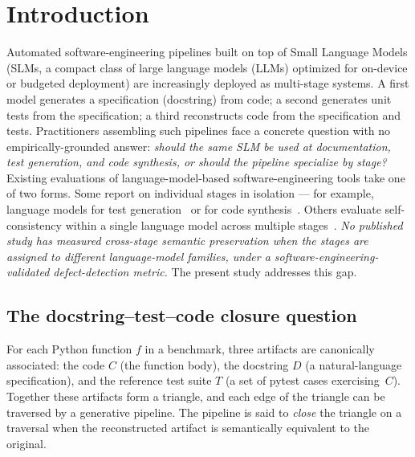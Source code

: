 \section{Introduction}
\label{sec:introduction}

Automated software-engineering pipelines built on top of Small Language Models (SLMs, a compact class of large language models (LLMs) optimized for on-device or budgeted deployment) are increasingly deployed as multi-stage systems. A first model generates a specification (docstring) from code; a second generates unit tests from the specification; a third reconstructs code from the specification and tests. Practitioners assembling such pipelines face a concrete question with no empirically-grounded answer: \emph{should the same SLM be used at documentation, test generation, and code synthesis, or should the pipeline specialize by stage?} Existing evaluations of language-model-based software-engineering tools take one of two forms. Some report on individual stages in isolation --- for example, language models for test generation~\citep{Schafer2024TestPilot, Tufano2022LLMTest} or for code synthesis~\citep{Chen2021HumanEval}. Others evaluate self-consistency within a single language model across multiple stages~\citep{Allamanis2024RTC, Zhang2025CodingTriangle}. \emph{No published study has measured cross-stage semantic preservation when the stages are assigned to different language-model families, under a software-engineering-validated defect-detection metric.} The present study addresses this gap.

\subsection{The docstring--test--code closure question}

For each Python function $f$ in a benchmark, three artifacts are canonically associated: the code $C$ (the function body), the docstring $D$ (a natural-language specification), and the reference test suite $T$ (a set of pytest cases exercising~$C$). Together these artifacts form a triangle, and each edge of the triangle can be traversed by a generative pipeline. The pipeline is said to \emph{close} the triangle on a traversal when the reconstructed artifact is semantically equivalent to the original.

